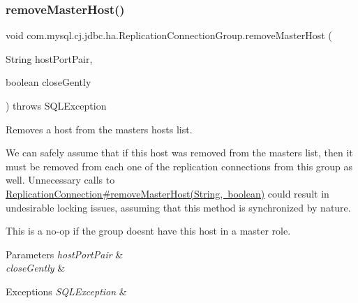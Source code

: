 \subsubsection{\texorpdfstring{remove\+Master\+Host()}{removeMasterHost()}\hspace{0.1cm}{\footnotesize\ttfamily [2/2]}}
{\footnotesize\ttfamily void com.\+mysql.\+cj.\+jdbc.\+ha.\+Replication\+Connection\+Group.\+remove\+Master\+Host (\begin{DoxyParamCaption}\item[{String}]{host\+Port\+Pair,  }\item[{boolean}]{close\+Gently }\end{DoxyParamCaption}) throws S\+Q\+L\+Exception}

Removes a host from the masters hosts list.

We can safely assume that if this host was removed from the masters list, then it must be removed from each one of the replication connections from this group as well. Unnecessary calls to \mbox{\hyperlink{interfacecom_1_1mysql_1_1cj_1_1jdbc_1_1ha_1_1_replication_connection_a47341136bcee35fd889a2d568e375756}{Replication\+Connection\#remove\+Master\+Host(\+String, boolean)}} could result in undesirable locking issues, assuming that this method is synchronized by nature.

This is a no-\/op if the group doesn\textquotesingle{}t have this host in a master role.


\begin{DoxyParams}{Parameters}
{\em host\+Port\+Pair} & \\
\hline
{\em close\+Gently} & \\
\hline
\end{DoxyParams}

\begin{DoxyExceptions}{Exceptions}
{\em S\+Q\+L\+Exception} & \\
\hline
\end{DoxyExceptions}
\mbox{\label{classcom_1_1mysql_1_1cj_1_1jdbc_1_1ha_1_1_replication_connection_group_a9aa1953764777765fa5c2b58498534a1}} 
